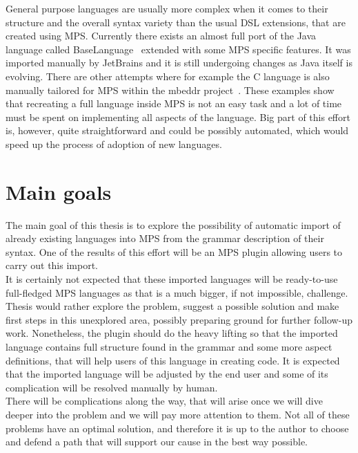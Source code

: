 General purpose languages are usually more complex when it comes to their structure and the overall syntax variety than the usual DSL extensions, that are created using MPS.
Currently there exists an almost full port of the Java language called BaseLanguage~\cite{BaseLanguage} extended with some MPS specific features.
It was imported manually by JetBrains and it is still undergoing changes as Java itself is evolving.
There are other attempts where for example the C language is also manually tailored for MPS within the mbeddr project~\cite{mbeddr}.
These examples show that recreating a full language inside MPS is not an easy task and a lot of time must be spent on implementing all aspects of the language.
Big part of this effort is, however, quite straightforward and could be possibly automated, which would speed up the process of adoption of new languages.

\section{Main goals}
\label{chap:main_goals}

The main goal of this thesis is to explore the possibility of automatic import of already existing languages into MPS from the grammar description of their syntax.
One of the results of this effort will be an MPS plugin allowing users to carry out this import.
\\

It is certainly not expected that these imported languages will be ready-to-use full-fledged MPS languages as that is a much bigger, if not impossible, challenge.
Thesis would rather explore the problem, suggest a possible solution and make first steps in this unexplored area, possibly preparing ground for further follow-up work.
Nonetheless, the plugin should do the heavy lifting so that the imported language contains full structure found in the grammar and some more aspect definitions, that will help users of this language in creating code.
It is expected that the imported language will be adjusted by the end user and some of its complication will be resolved manually by human.
\\

There will be complications along the way, that will arise once we will dive deeper into the problem and we will pay more attention to them.
Not all of these problems have an optimal solution, and therefore it is up to the author to choose and defend a path that will support our cause in the best way possible.
\\

